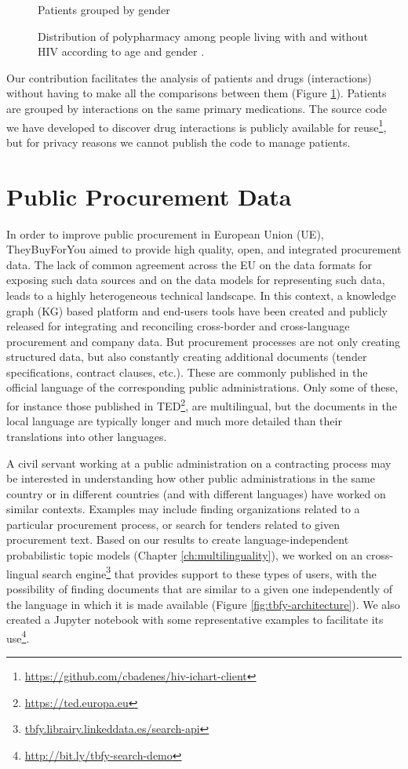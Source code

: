 \begin{figure}[ht]
\begin {minipage}[c]{0.49\textwidth}
     \caption{Patients grouped by gender}\label{subfig:poly-gender}
   \end{minipage}
   \caption{Distribution of polypharmacy among people living with and without HIV according to age and gender \citep{Badenes-Olmedo2019c}.}
   \label{fig:polypharmacy}
\end{figure}

Our contribution facilitates the analysis of patients and drugs (interactions) without having to make all the comparisons between them (Figure \ref{fig:polypharmacy}). Patients are grouped by interactions on the same primary medications. The source code we have developed to discover drug interactions is publicly available for reuse\footnote{\url{https://github.com/cbadenes/hiv-ichart-client}}, but for privacy reasons we cannot publish the code to manage patients. 

\section{Public Procurement Data}
\label{sec:tbfy}

In order to improve public procurement in European Union (UE), TheyBuyForYou \citep{Ahmet2020} aimed to provide high quality, open, and integrated procurement data. The lack of common agreement across the EU on the data formats for exposing such data sources and on the data models for representing such data, leads to a highly heterogeneous technical landscape. In this context, a knowledge graph (KG) based platform and end-users tools have been created and publicly released for integrating and reconciling cross-border and cross-language procurement and company data. But procurement processes are not only creating structured data, but also constantly creating additional documents (tender specifications, contract clauses, etc.). These are commonly published in the official language of the corresponding public administrations. Only some of these, for instance those published in TED\footnote{\url{https://ted.europa.eu}}, are multilingual, but the documents in the local language are typically longer and much more detailed than their translations into other languages.

A civil servant working at a public administration on a contracting process may be interested in understanding how other public administrations in the same country or in different countries (and with different languages) have worked on similar contexts. Examples may include finding organizations related to a particular procurement process, or search for tenders related to given
procurement text. Based on our results to create language-independent probabilistic topic models (Chapter \ref{ch:multilinguality}), we worked on an cross-lingual search engine\footnote{\url{tbfy.librairy.linkeddata.es/search-api}} that provides support to these types of users, with the possibility of finding documents that are similar to a given one independently of the language in which it is made available (Figure \ref{fig:tbfy-architecture}). We also created a Jupyter notebook with some representative examples to facilitate its use\footnote{\url{http://bit.ly/tbfy-search-demo}}.

